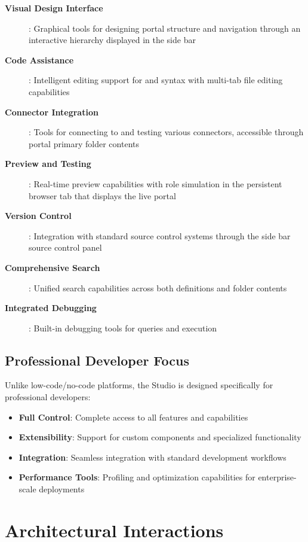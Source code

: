 \begin{description}
\item[\textbf{Visual Design Interface}]: Graphical tools for designing portal structure and navigation through an interactive \webbase{} hierarchy displayed in the side bar
\item[\textbf{Code Assistance}]: Intelligent editing support for \wbol{} and \wbpl{} syntax with multi-tab file editing capabilities
\item[\textbf{Connector Integration}]: Tools for connecting to and testing various connectors, accessible through portal primary folder contents
\item[\textbf{Preview and Testing}]: Real-time preview capabilities with role simulation in the persistent browser tab that displays the live portal
\item[\textbf{Version Control}]: Integration with standard source control systems through the side bar source control panel
\item[\textbf{Comprehensive Search}]: Unified search capabilities across both \webbase{} definitions and folder contents
\item[\textbf{Integrated Debugging}]: Built-in debugging tools for \wbpl{} queries and \webbaselet{} execution
\end{description}

\subsection{Professional Developer Focus}

Unlike low-code/no-code platforms, the Studio is designed specifically for professional developers:

\begin{itemize}
	\item \textbf{Full Control}: Complete access to all \wbol{} features and capabilities
	\item \textbf{Extensibility}: Support for custom components and specialized functionality
	\item \textbf{Integration}: Seamless integration with standard development workflows
	\item \textbf{Performance Tools}: Profiling and optimization capabilities for enterprise-scale deployments
\end{itemize}

\section{Architectural Interactions}
\label{sec:architectural-interactions}

